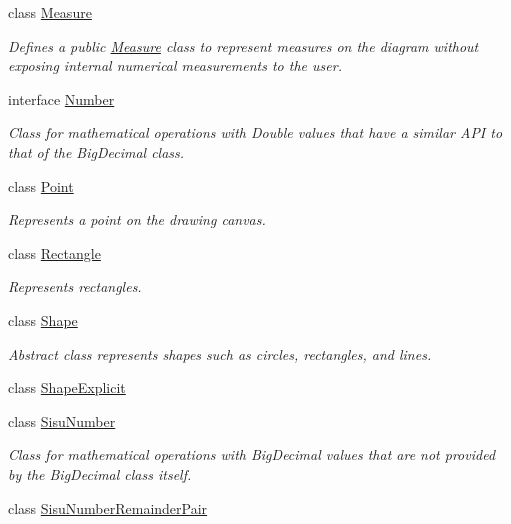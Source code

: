 \begin{DoxyCompactItemize}
class \hyperlink{classcom_1_1aarrelaakso_1_1drawl_1_1_measure}{Measure}
\begin{DoxyCompactList}\small\item\em Defines a public \hyperlink{classcom_1_1aarrelaakso_1_1drawl_1_1_measure}{Measure} class to represent measures on the diagram without exposing internal numerical measurements to the user. \end{DoxyCompactList}\item 
interface \hyperlink{interfacecom_1_1aarrelaakso_1_1drawl_1_1_number}{Number}
\begin{DoxyCompactList}\small\item\em Class for mathematical operations with Double values that have a similar A\+PI to that of the Big\+Decimal class. \end{DoxyCompactList}\item 
class \hyperlink{classcom_1_1aarrelaakso_1_1drawl_1_1_point}{Point}
\begin{DoxyCompactList}\small\item\em Represents a point on the drawing canvas. \end{DoxyCompactList}\item 
class \hyperlink{classcom_1_1aarrelaakso_1_1drawl_1_1_rectangle}{Rectangle}
\begin{DoxyCompactList}\small\item\em Represents rectangles. \end{DoxyCompactList}\item 
class \hyperlink{classcom_1_1aarrelaakso_1_1drawl_1_1_shape}{Shape}
\begin{DoxyCompactList}\small\item\em Abstract class represents shapes such as circles, rectangles, and lines. \end{DoxyCompactList}\item 
class \hyperlink{classcom_1_1aarrelaakso_1_1drawl_1_1_shape_explicit}{Shape\+Explicit}
\item 
class \hyperlink{classcom_1_1aarrelaakso_1_1drawl_1_1_sisu_number}{Sisu\+Number}
\begin{DoxyCompactList}\small\item\em Class for mathematical operations with Big\+Decimal values that are not provided by the Big\+Decimal class itself. \end{DoxyCompactList}\item 
class \hyperlink{classcom_1_1aarrelaakso_1_1drawl_1_1_sisu_number_remainder_pair}{Sisu\+Number\+Remainder\+Pair}

\end{DoxyCompactItemize}
